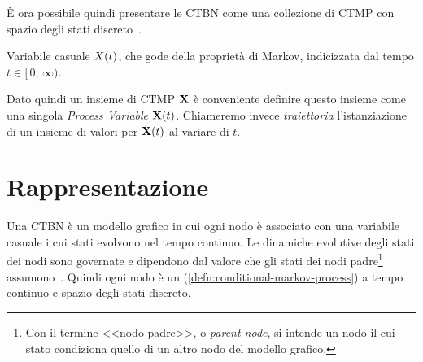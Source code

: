  \`E ora possibile quindi presentare le \acl{CTBN} come una collezione di \ac{CTMP} con spazio degli stati discreto~\cite{Nodelman2007}.

\begin{definizione}
Variabile casuale $\mathnormal{X}(t)$, che gode della proprietà di Markov, indicizzata dal tempo $t\in[\,0,\,\infty)$.
\end{definizione}

Dato quindi un insieme di \acl{CTMP} $\mathbf{X}$ è conveniente definire questo insieme come una singola \emph{Process Variable} $\mathbf{X}(t)$.
Chiameremo invece \emph{traiettoria} l'istanziazione di un insieme di valori per $\mathbf{X}(t)$ al variare di $t$.

\section{Rappresentazione}
\label{sec:ctbn-rappresentazione}

Una \acl{CTBN} è un modello grafico in cui ogni nodo è associato con una variabile casuale i cui stati evolvono nel tempo continuo. Le dinamiche evolutive degli stati dei nodi sono governate e dipendono dal valore che gli stati dei nodi padre\footnote{Con il termine <<nodo padre>>, o \emph{parent node}, si intende un nodo il cui stato condiziona quello di un altro nodo del modello grafico.} assumono~\cite{Stella2012}. Quindi ogni nodo è un \conm\mprocess{} (\ref{defn:conditional-markov-process}) a tempo continuo e spazio degli stati discreto.

